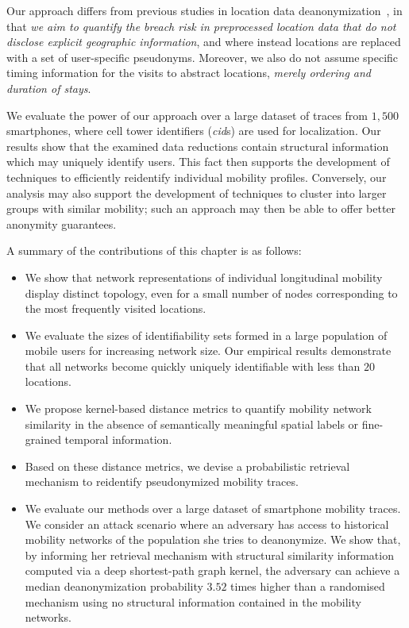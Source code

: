Our approach differs from previous studies in location data deanonymization~\citep{Gambs2014, deMulder08, Naini2016a, Golle2009}, in that \emph{we aim to quantify the breach risk in preprocessed location data that do not disclose explicit geographic information}, and where instead locations are replaced with a set of user-specific pseudonyms.
Moreover, we also do not assume specific timing information for the visits to abstract locations, \emph{merely ordering and duration of stays}.

We evaluate the power of our approach over a large dataset of traces from $1,500$ smartphones, where cell tower identifiers (\emph{cid}s) are used for localization.
Our results show that the examined data reductions contain structural information which may uniquely identify users.
This fact then supports the development of techniques to efficiently reidentify individual mobility profiles.
Conversely, our analysis may also support the development of techniques to cluster into larger groups with similar mobility; such an approach may then be able to offer better anonymity guarantees.

A summary of the contributions of this chapter is as follows:

\begin{itemize}

\item We show that network representations of individual longitudinal mobility display distinct topology, even for a small number of nodes corresponding to the most frequently visited locations.

\item We evaluate the sizes of identifiability sets formed in a large population of mobile users for increasing network size.
Our empirical results demonstrate that all networks become quickly uniquely identifiable with less than $20$ locations.

\item We propose kernel-based distance metrics to quantify mobility network similarity in the absence of semantically meaningful spatial labels or fine-grained temporal information.

\item Based on these distance metrics, we devise a probabilistic retrieval mechanism to reidentify pseudonymized mobility traces.

\item We evaluate our methods over a large dataset of smartphone mobility traces. We consider an attack scenario where an adversary has access to historical mobility networks of the population she tries to deanonymize. We show that, by informing her retrieval mechanism with structural similarity information computed via a deep shortest-path graph kernel, the adversary can achieve a median deanonymization probability $3.52$ times higher than a randomised mechanism using no structural information contained in the mobility networks.

\end{itemize}

